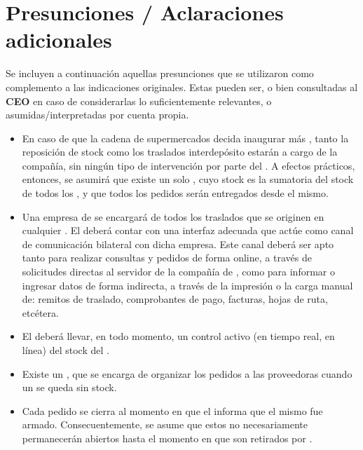 
\section{Presunciones / Aclaraciones adicionales}

Se incluyen a continuación aquellas presunciones que se utilizaron como
complemento a las indicaciones originales. Estas pueden ser, o bien consultadas
al \textbf{CEO} en caso de considerarlas lo suficientemente relevantes, o
asumidas/interpretadas por cuenta propia.

\begin{itemize}

  \item En caso de que la cadena de supermercados decida inaugurar más
\textbf{}, tanto la reposición de stock como los traslados
interdepósito estarán a cargo de la compañía, sin ningún tipo de intervención
por parte del \textbf{}. A efectos prácticos, entonces, se asumirá
que existe un solo \textbf{}, cuyo stock es la sumatoria del stock
de todos los \textbf{}, y que todos los pedidos serán entregados
desde el mismo.

  \item Una empresa de \textbf{} se encargará de todos los
traslados que se originen en cualquier \textbf{}. El
\textbf{} deberá contar con una interfaz adecuada que actúe como
canal de comunicación bilateral con dicha empresa. Este canal deberá ser apto
tanto para realizar consultas y pedidos de forma online, a través de solicitudes
directas al servidor de la compañía de \textbf{}, como para
informar o ingresar datos de forma indirecta, a través de la impresión o la
carga manual de: remitos de traslado, comprobantes de pago, facturas, hojas de
ruta, etcétera.

  \item El \textbf{} deberá llevar, en todo momento, un control
activo (en tiempo real, en línea) del stock del \textbf{}.

  \item Existe un \textbf{}, que se encarga de
organizar los pedidos a las proveedoras cuando un \textbf{} se
queda sin stock.

  \item Cada pedido se cierra al momento en que el \textbf{}
informa que el mismo fue armado. Consecuentemente, se asume que estos no
necesariamente permanecerán abiertos hasta el momento en que son retirados por
\textbf{}.

\end{itemize}
